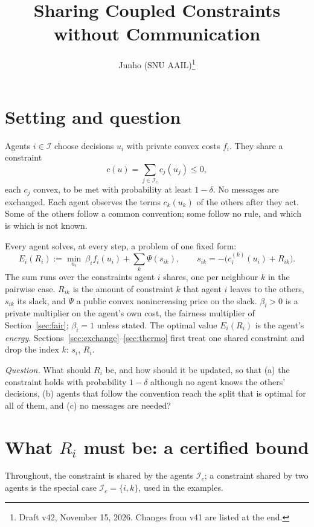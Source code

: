 \documentclass[11pt]{article}
\title{Sharing Coupled Constraints without Communication}
\author{Junho (SNU AAIL)\thanks{Draft v42, November 15, 2026. Changes from v41 are listed at the end.}}
\date{}
\theoremstyle{definition}
\theoremstyle{remark}
\newcommand{\I}{\mathcal{I}}
\begin{document}
\maketitle

\section{Setting and question}
Agents $i\in\I$ choose decisions $u_i$ with private convex costs $f_i$. They share a constraint
\begin{equation}\label{eq:c}
c(u)=\sum_{j\in\I_c} c_j(u_j)\le 0,
\end{equation}
each $c_j$ convex, to be met with probability at least $1-\delta$. No messages are exchanged. Each agent observes the terms $c_k(u_k)$ of the others after they act. Some of the others follow a common convention; some follow no rule, and which is which is not known.

Every agent solves, at every step, a problem of one fixed form:
\begin{equation}\label{eq:local}
E_i(R_i):=\min_{u_i}\ \beta_i f_i(u_i)+\sum_k\Psi(s_{ik}),\qquad s_{ik}=-\big(c^{(k)}_i(u_i)+R_{ik}\big).
\end{equation}
The sum runs over the constraints agent $i$ shares, one per neighbour $k$ in the pairwise case. $R_{ik}$ is the amount of constraint $k$ that agent $i$ leaves to the others, $s_{ik}$ its slack, and $\Psi$ a public convex nonincreasing price on the slack. $\beta_i>0$ is a private multiplier on the agent's own cost, the fairness multiplier of Section~\ref{sec:fair}; $\beta_i=1$ unless stated. The optimal value $E_i(R_i)$ is the agent's \emph{energy}. Sections~\ref{sec:exchange}--\ref{sec:thermo} first treat one shared constraint and drop the index $k$: $s_i$, $R_i$.

\emph{Question.} What should $R_i$ be, and how should it be updated, so that (a) the constraint holds with probability $1-\delta$ although no agent knows the others' decisions, (b) agents that follow the convention reach the split that is optimal for all of them, and (c) no messages are needed?

\section{What $R_i$ must be: a certified bound}
Throughout, the constraint is shared by the agents $\I_c$; a constraint shared by two agents is the special case $\I_c=\{i,k\}$, used in the examples.
\end{document}
